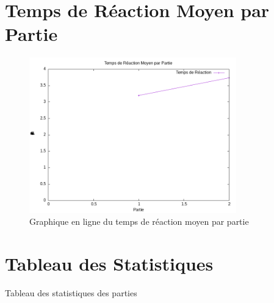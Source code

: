 \documentclass{article}
\begin{document}
\section*{Temps de Réaction Moyen par Partie}
\begin{figure}[h!]
    \centering
    \includegraphics[width=0.8\textwidth]{temps_reaction.png}
    \caption{Graphique en ligne du temps de réaction moyen par partie}
\end{figure}

\section*{Tableau des Statistiques}
\begin{table}[ht!]
\centering
\caption{Tableau des statistiques des parties}
\end{table}
\end{document}
